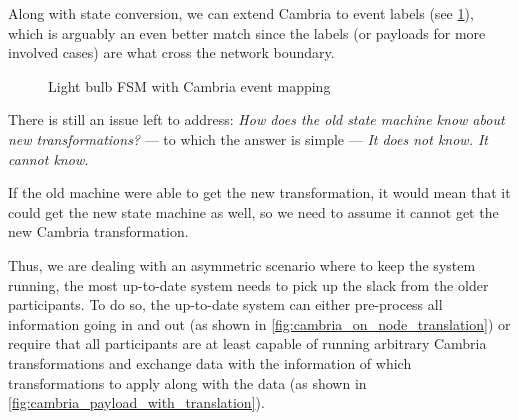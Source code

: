 \documentclass[a4paper]{article}
\begin{document}
Along with state conversion, we can extend Cambria to event labels (see \cref{fig:bulb_fsm_event_cambria}),
which is arguably an even better match since the labels (or payloads for more involved cases)
are what cross the network boundary.

\begin{figure}[ht]
    \centering
    \caption{Light bulb FSM with Cambria event mapping}
    \label{fig:bulb_fsm_event_cambria}
\end{figure}

There is still an issue left to address: \emph{How does the old state machine know about new transformations?}
— to which the answer is simple — \emph{It does not know. It cannot know.}

If the old machine were able to get the new transformation,
it would mean that it could get the new state machine as well,
so we need to assume it cannot get the new Cambria transformation.

Thus, we are dealing with an asymmetric scenario where to keep the system running,
the most up-to-date system needs to pick up the slack from the older participants.
To do so, the up-to-date system can either pre-process all information going in and out
(as shown in \cref{fig:cambria_on_node_translation}) or require that all participants are
at least capable of running arbitrary Cambria transformations and exchange data with
the information of which transformations to apply along with the data
(as shown in \cref{fig:cambria_payload_with_translation}).
\end{document}
